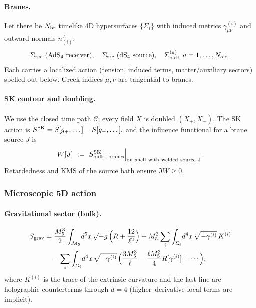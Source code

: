 \documentclass[10pt]{article}
\theoremstyle{definition}
\theoremstyle{plain}
\begin{document}
\paragraph{Branes.}\label{par:uom-main-073}
Let there be $N_{\rm br}$ timelike 4D hypersurfaces $\{\Sigma_i\}$ with induced metrics $\gamma^{(i)}_{\mu\nu}$ and outward normals $n^A_{(i)}$:
\[
\Sigma_{\rm rec}\ (\text{AdS}_4\ \text{receiver}),\quad
\Sigma_{\rm src}\ (\text{dS}_4\ \text{source}),\quad
\Sigma_{\rm old}^{(a)},\ a=1,\dots,N_{\rm old}.
\]
Each carries a localized action (tension, induced terms, matter/auxiliary sectors) spelled out below. Greek indices $\mu,\nu$ are tangential to branes.

\paragraph{SK contour and doubling.}\label{par:uom-main-074}
We use the closed time path $\mathcal C$; every field $X$ is doubled $(X_+,X_-)$.
The SK action is
\(
S^{\rm SK}=S[g_+,\dots]-S[g_-,\dots],
\)
and the influence functional for a brane source $J$ is
\begin{equation}
W[J]\ :=\ S^{\rm SK}_{\rm bulk+branes}\Big|_{\rm on\ shell\ with\ welded\ source\ J}.
\label{eq:W-def}
\end{equation}
Retardedness and KMS of the source bath ensure $\Im W\ge 0$.

\subsubsection*{Microscopic 5D action}
\label{subsubsec:5D-action-micro}

\paragraph{Gravitational sector (bulk).}\label{par:uom-main-075}
\begin{align}
S_{\rm grav}
&=\frac{M_5^3}{2}\int_{\mathcal M_5}\! d^5x\,\sqrt{-g}\,\Big(R+\frac{12}{\ell^2}\Big)
+M_5^3\sum_i\int_{\Sigma_i}\! d^4x\,\sqrt{-\gamma^{(i)}}\,K^{(i)}
\nonumber\\
&\quad
-\sum_i\int_{\Sigma_i}\! d^4x\,\sqrt{-\gamma^{(i)}}\,\Big(
\frac{3M_5^3}{\ell} - \frac{\ell M_5^3}{4}R[\gamma^{(i)}]+\cdots\Big),
\label{eq:Sgrav}
\end{align}
where $K^{(i)}$ is the trace of the extrinsic curvature and the last line are holographic counterterms through $d{=}4$ (higher–derivative local terms are implicit).
\end{document}

